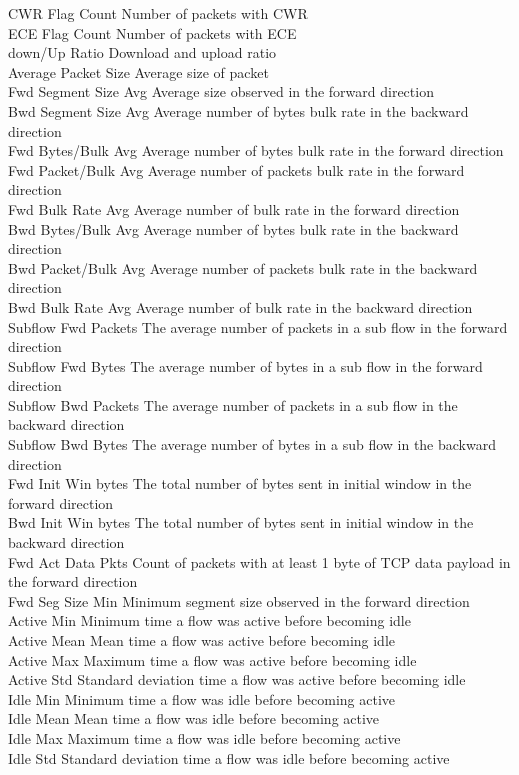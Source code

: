 CWR Flag Count 			Number of packets with CWR \\
ECE Flag Count 			Number of packets with ECE \\
down/Up Ratio			Download and upload ratio \\
Average Packet Size 		Average size of packet \\
Fwd Segment Size Avg 		Average size observed in the forward direction \\
Bwd Segment Size Avg 		Average number of bytes bulk rate in the backward direction \\
Fwd Bytes/Bulk Avg		Average number of bytes bulk rate in the forward direction \\
Fwd Packet/Bulk Avg		Average number of packets bulk rate in the forward direction \\
Fwd Bulk Rate Avg 		Average number of bulk rate in the forward direction \\
Bwd Bytes/Bulk Avg		Average number of bytes bulk rate in the backward direction \\
Bwd Packet/Bulk Avg 		Average number of packets bulk rate in the backward direction \\
Bwd Bulk Rate Avg		Average number of bulk rate in the backward direction \\
Subflow Fwd Packets		The average number of packets in a sub flow in the forward direction \\
Subflow Fwd Bytes		The average number of bytes in a sub flow in the forward direction \\
Subflow Bwd Packets		The average number of packets in a sub flow in the backward direction \\
Subflow Bwd Bytes		The average number of bytes in a sub flow in the backward direction \\
Fwd Init Win bytes		The total number of bytes sent in initial window in the forward direction \\
Bwd Init Win bytes		The total number of bytes sent in initial window in the backward direction \\
Fwd Act Data Pkts		Count of packets with at least 1 byte of TCP data payload in the forward direction \\
Fwd Seg Size Min		Minimum segment size observed in the forward direction \\
Active Min			Minimum time a flow was active before becoming idle \\
Active Mean			Mean time a flow was active before becoming idle \\
Active Max			Maximum time a flow was active before becoming idle \\
Active Std			Standard deviation time a flow was active before becoming idle \\
Idle Min			Minimum time a flow was idle before becoming active \\
Idle Mean			Mean time a flow was idle before becoming active \\
Idle Max			Maximum time a flow was idle before becoming active \\
Idle Std			Standard deviation time a flow was idle before becoming active \\
